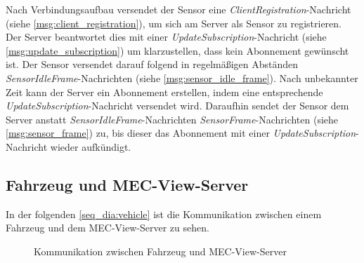 Nach Verbindungsaufbau versendet der Sensor eine \textit{ClientRegistration}-Nachricht (siehe \autoref{msg:client_registration}), um sich am Server als Sensor zu registrieren.
Der Server beantwortet dies mit einer \textit{UpdateSubscription}-Nachricht (siehe \autoref{msg:update_subscription}) um klarzustellen, dass kein Abonnement gewünscht ist.
Der Sensor versendet darauf folgend in regelmäßigen Abständen \textit{SensorIdleFrame}-Nachrichten (siehe \autoref{msg:sensor_idle_frame}).
Nach unbekannter Zeit kann der Server ein Abonnement erstellen, indem eine entsprechende \textit{UpdateSubscription}-Nachricht versendet wird.
Daraufhin sendet der Sensor dem Server anstatt \textit{SensorIdleFrame}-Nachrichten \textit{SensorFrame}-Nachrichten (siehe \autoref{msg:sensor_frame}) zu, bis dieser das Abonnement mit einer \textit{UpdateSubscription}-Nachricht wieder aufkündigt.

\subsection{Fahrzeug und MEC-View-Server}


In der folgenden \autoref{seq_dia:vehicle} ist die Kommunikation zwischen einem Fahrzeug und dem MEC-View-Server zu sehen.

\begin{figure}[H]
	\centering
	\caption{Kommunikation zwischen Fahrzeug und MEC-View-Server}
	\label{seq_dia:vehicle}
\end{figure}

